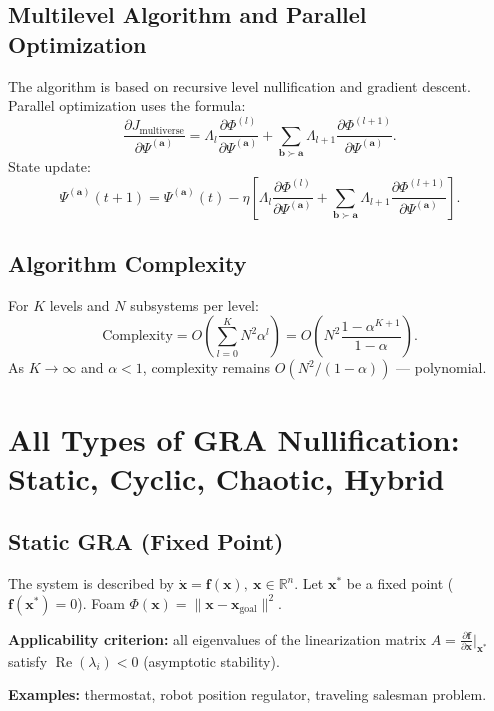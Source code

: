 \documentclass[12pt,a4paper]{article}
\begin{document}
\subsection{Multilevel Algorithm and Parallel Optimization}

The algorithm is based on recursive level nullification and gradient descent. Parallel optimization uses the formula:
\[
\frac{\partial J_{\text{multiverse}}}{\partial \Psi^{(\mathbf{a})}} = \Lambda_l \frac{\partial \Phi^{(l)}}{\partial \Psi^{(\mathbf{a})}} + \sum_{\mathbf{b}\succ\mathbf{a}} \Lambda_{l+1} \frac{\partial \Phi^{(l+1)}}{\partial \Psi^{(\mathbf{a})}}.
\]
State update:
\[
\Psi^{(\mathbf{a})}(t+1) = \Psi^{(\mathbf{a})}(t) - \eta \left[ \Lambda_l \frac{\partial \Phi^{(l)}}{\partial \Psi^{(\mathbf{a})}} + \sum_{\mathbf{b}\succ\mathbf{a}} \Lambda_{l+1} \frac{\partial \Phi^{(l+1)}}{\partial \Psi^{(\mathbf{a})}} \right].
\]

\subsection{Algorithm Complexity}

For \(K\) levels and \(N\) subsystems per level:
\[
\text{Complexity} = O\!\left( \sum_{l=0}^K N^2 \alpha^l \right) = O\!\left( N^2 \frac{1-\alpha^{K+1}}{1-\alpha} \right).
\]
As \(K\to\infty\) and \(\alpha<1\), complexity remains \(O(N^2/(1-\alpha))\) — polynomial.

\section{All Types of GRA Nullification: Static, Cyclic, Chaotic, Hybrid}

\subsection{Static GRA (Fixed Point)}

The system is described by \(\dot{\mathbf{x}} = \mathbf{f}(\mathbf{x}),\ \mathbf{x}\in\mathbb{R}^n\). Let \(\mathbf{x}^*\) be a fixed point (\(\mathbf{f}(\mathbf{x}^*)=0\)). Foam \(\Phi(\mathbf{x}) = \|\mathbf{x} - \mathbf{x}_{\text{goal}}\|^2\).

\textbf{Applicability criterion:} all eigenvalues of the linearization matrix \(A = \frac{\partial\mathbf{f}}{\partial\mathbf{x}}\big|_{\mathbf{x}^*}\) satisfy \(\operatorname{Re}(\lambda_i) < 0\) (asymptotic stability).

\textbf{Examples:} thermostat, robot position regulator, traveling salesman problem.
\end{document}
